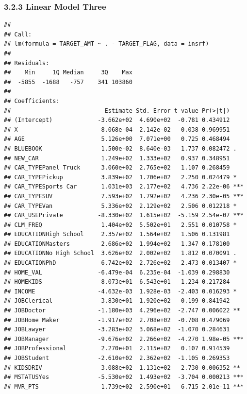 \documentclass[]{article}
\begin{document}
\subsubsection{3.2.3 Linear Model Three}\label{linear-model-three}

\begin{verbatim}
## 
## Call:
## lm(formula = TARGET_AMT ~ . - TARGET_FLAG, data = insrf)
## 
## Residuals:
##    Min     1Q Median     3Q    Max 
##  -5855  -1688   -757    341 103860 
## 
## Coefficients:
##                           Estimate Std. Error t value Pr(>|t|)    
## (Intercept)             -3.662e+02  4.690e+02  -0.781 0.434912    
## X                        8.068e-04  2.142e-02   0.038 0.969951    
## AGE                      5.126e+00  7.071e+00   0.725 0.468494    
## BLUEBOOK                 1.500e-02  8.640e-03   1.737 0.082472 .  
## NEW_CAR                  1.249e+02  1.333e+02   0.937 0.348951    
## CAR_TYPEPanel Truck      3.060e+02  2.765e+02   1.107 0.268459    
## CAR_TYPEPickup           3.839e+02  1.706e+02   2.250 0.024479 *  
## CAR_TYPESports Car       1.031e+03  2.177e+02   4.736 2.22e-06 ***
## CAR_TYPESUV              7.593e+02  1.792e+02   4.236 2.30e-05 ***
## CAR_TYPEVan              5.336e+02  2.129e+02   2.506 0.012218 *  
## CAR_USEPrivate          -8.330e+02  1.615e+02  -5.159 2.54e-07 ***
## CLM_FREQ                 1.404e+02  5.502e+01   2.551 0.010758 *  
## EDUCATIONHigh School     2.357e+02  1.564e+02   1.506 0.131981    
## EDUCATIONMasters         2.686e+02  1.994e+02   1.347 0.178100    
## EDUCATIONNo High School  3.626e+02  2.002e+02   1.812 0.070091 .  
## EDUCATIONPhD             6.742e+02  2.726e+02   2.473 0.013407 *  
## HOME_VAL                -6.479e-04  6.235e-04  -1.039 0.298830    
## HOMEKIDS                 8.073e+01  6.543e+01   1.234 0.217284    
## INCOME                  -4.632e-03  1.928e-03  -2.403 0.016293 *  
## JOBClerical              3.830e+01  1.920e+02   0.199 0.841942    
## JOBDoctor               -1.180e+03  4.296e+02  -2.747 0.006022 ** 
## JOBHome Maker           -1.917e+02  2.708e+02  -0.708 0.479069    
## JOBLawyer               -3.283e+02  3.068e+02  -1.070 0.284631    
## JOBManager              -9.676e+02  2.266e+02  -4.270 1.98e-05 ***
## JOBProfessional          2.270e+01  2.115e+02   0.107 0.914539    
## JOBStudent              -2.610e+02  2.362e+02  -1.105 0.269353    
## KIDSDRIV                 3.088e+02  1.131e+02   2.730 0.006352 ** 
## MSTATUSYes              -5.530e+02  1.493e+02  -3.704 0.000213 ***
## MVR_PTS                  1.739e+02  2.590e+01   6.715 2.01e-11 ***

\end{verbatim}
\end{document}
